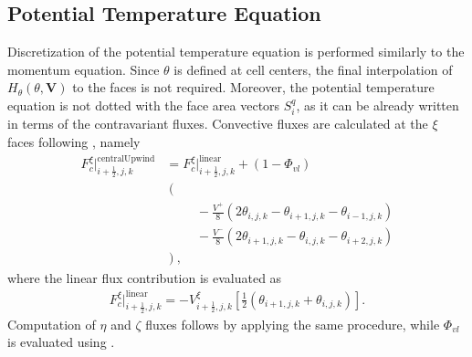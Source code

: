 \subsection{Potential Temperature Equation}
\label{subsec:temperatureDiscretization}
Discretization of the potential temperature equation is performed similarly to the momentum equation. Since $\theta$ is defined at cell centers, the final interpolation of $H_\theta(\theta,\mathbf{V})$ to the faces is not required. Moreover, the potential temperature equation is not dotted with the face area vectors $S^q_i$, as it can be already written in terms of the contravariant fluxes. Convective fluxes are calculated at the $\xi$ faces following , namely 
\begin{align}
	F^\xi_{c}\bigg|^\text{centralUpwind}_{i+\frac{1}{2},j,k} &= F^\xi_{c}\bigg|^\text{linear}_{i+\frac{1}{2},j,k} + (1-\Phi_{vl}) \nonumber \\
	&\left( \right. \nonumber \\
	&\hspace{1cm}-\frac{V^+}{8}\left(2\theta_{i,j,k} - \theta_{i+1,j,k} - \theta_{i-1,j,k}\right) \nonumber \\
	&\hspace{1cm}-\frac{V^-}{8}\left(2\theta_{i+1,j,k} - \theta_{i,j,k} - \theta_{i+2,j,k}\right) \nonumber \\
	&\left.\right), \label{eq:centralUpwindFluxesT}
\end{align}
where the linear flux contribution is evaluated as 
\begin{align}
	F^\xi_{c}\bigg|^\text{linear}_{i+\frac{1}{2},j,k} = -V^\xi_{i+\frac{1}{2},j,k} \left[\frac{1}{2}\left(\theta_{i+1,j,k}+\theta_{i,j,k}\right)\right]. \label{eq:linearFluxesT}
\end{align}
Computation of $\eta$ and $\zeta$ fluxes follows by applying the same procedure, while $\Phi_{vl}$ is evaluated using . 

